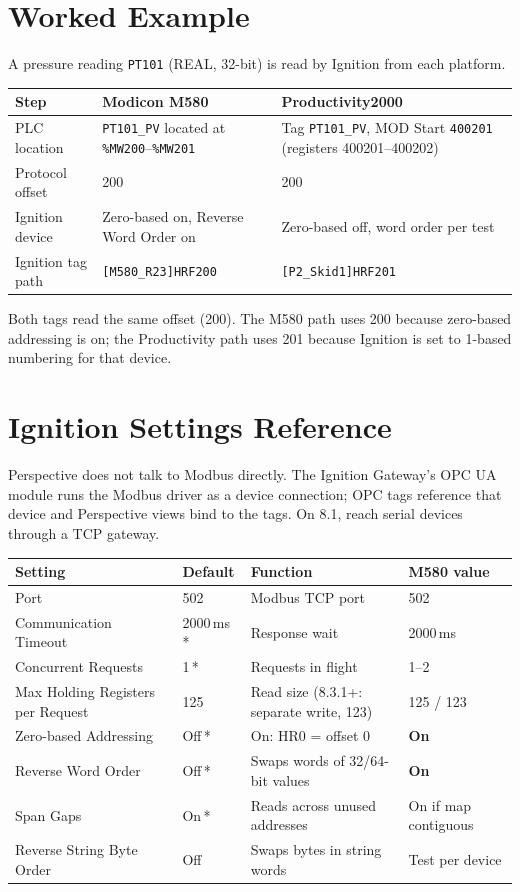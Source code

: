 \section{Worked Example}
A pressure reading \texttt{PT101} (REAL, 32-bit) is read by Ignition from each platform.
\begin{longtable}{@{}P{3.01cm}P{6.31cm}P{6.31cm}@{}}
\toprule
\textbf{Step} & \textbf{Modicon M580} & \textbf{Productivity2000} \\
\midrule
\endhead
PLC location & \texttt{PT101\_PV} located at \texttt{\%MW200}--\texttt{\%MW201} & Tag \texttt{PT101\_PV}, MOD Start \texttt{400201} (registers 400201--400202) \\
Protocol offset & 200 & 200 \\
Ignition device & Zero-based on, Reverse Word Order on & Zero-based off, word order per test \\
Ignition tag path & \texttt{[M580\_R23]HRF200} & \texttt{[P2\_Skid1]HRF201} \\
\bottomrule
\end{longtable}
Both tags read the same offset (200). The M580 path uses 200 because zero-based addressing is on; the Productivity path uses 201 because Ignition is set to 1-based numbering for that device.

\section{Ignition Settings Reference}
Perspective does not talk to Modbus directly. The Ignition Gateway's OPC UA module runs the Modbus driver as a device connection; OPC tags reference that device and Perspective views bind to the tags. On 8.1, reach serial devices through a TCP gateway.

\begin{longtable}{@{}P{4.86cm}P{2.54cm}P{4.65cm}P{3.17cm}@{}}
\toprule
\textbf{Setting} & \textbf{Default} & \textbf{Function} & \textbf{M580 value} \\
\midrule
\endhead
Port & 502 & Modbus TCP port & 502 \\
Communication Timeout & 2000\,ms\,* & Response wait & 2000\,ms \\
Concurrent Requests & 1\,* & Requests in flight & 1--2 \\
Max Holding Registers per Request & 125 & Read size (8.3.1+: separate write, 123) & 125 / 123 \\
Zero-based Addressing & Off\,* & On: HR0 = offset 0 & \textbf{On} \\
Reverse Word Order & Off\,* & Swaps words of 32/64-bit values & \textbf{On} \\
Span Gaps & On\,* & Reads across unused addresses & On if map contiguous \\
Reverse String Byte Order & Off & Swaps bytes in string words & Test per device \\
\bottomrule
\end{longtable}


